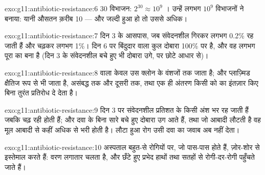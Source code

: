 \begin{solution}{exo:g11:antibiotic-resistance:6}
30 विभाजन: $2^{30} \approx 10^9$ । उन्हें लगभग $10^9$ विभाजनों ने
बनाया: यानी औसतन क़रीब 10   --- और  जल्दी हुआ
हो तो उससे अधिक।
\end{solution}

\begin{solution}{exo:g11:antibiotic-resistance:7}
दिन 3 के आसपास, जब संवेदनशील  गिरकर लगभग 0.2\% रह जाती हैं और
 चढ़कर लगभग 1\%। दिन 6 पर बिंदुदार वाला कुल दोबारा 100\% पर है,
और वह लगभग पूरा   का बना है (दिन 3 के संवेदनशील बचे हुए
भी दोबारा उगे, पर छोटे आधार से)।
\end{solution}

\begin{solution}{exo:g11:antibiotic-resistance:8}
 वाला  केवल उस क्लोन के वंशजों तक जाता है; और प्लाज़्मिड
क्षैतिज रूप से भी जाता है, असंबद्ध  तक और दूसरी  तक, तथा एक
ही अंतरण किसी  को  का इंतज़ार किए बिना तुरंत प्रतिरोध दे
देता है।
\end{solution}

\begin{solution}{exo:g11:antibiotic-resistance:9}
दिन 3 पर संवेदनशील  प्रतिशत के किसी अंश भर रह जाती हैं जबकि
 चढ़ रही होती हैं; और दवा के बिना सारे बचे हुए दोबारा उग आते हैं,
तथा जो आबादी लौटती है वह मूल आबादी से कहीं अधिक  से भरी होती
है। लौटा हुआ रोग उसी दवा का जवाब अब नहीं देता।
\end{solution}

\begin{solution}{exo:g11:antibiotic-resistance:10}
अस्पताल बहुत-से रोगियों पर, जो पास-पास होते हैं,  ज़ोर-शोर से
इस्तेमाल करते हैं: वरण लगातार चलता है, और छँटे हुए प्रभेद हाथों तथा सतहों
से रोगी-दर-रोगी पहुँचते जाते हैं।
\end{solution}

